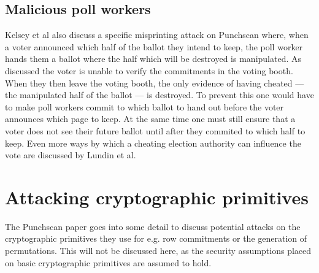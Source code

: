 \subsection{Malicious poll workers}

Kelsey et al also discuss a specific misprinting attack on
Punchscan\autocite[chapter 3]{kelseyAttackingPaperBasedE2E2010} where, when a
voter announced which half of the ballot they intend to keep, the poll worker
hands them a ballot where the half which will be destroyed is manipulated. As
discussed the voter is unable to verify the commitments in the voting booth.
When they then leave the voting booth, the only evidence of having cheated ---
the manipulated half of the ballot --- is destroyed. To prevent this one would
have to make poll workers commit to which ballot to hand out before the voter
announces which page to keep. At the same time one must still ensure that a
voter does not see their future ballot until after they commited to which half
to keep. Even more ways by which a cheating election authority can influence
the vote are discussed by Lundin et al\autocite{lundinTearDestroyChain2012}.

\section{Attacking cryptographic primitives}

The Punchscan paper goes into some detail to discuss potential attacks on the
cryptographic primitives they use for e.g. row commitments or the generation of
permutations. This will not be discussed here, as the security assumptions
placed on basic cryptographic primitives are assumed to hold.
